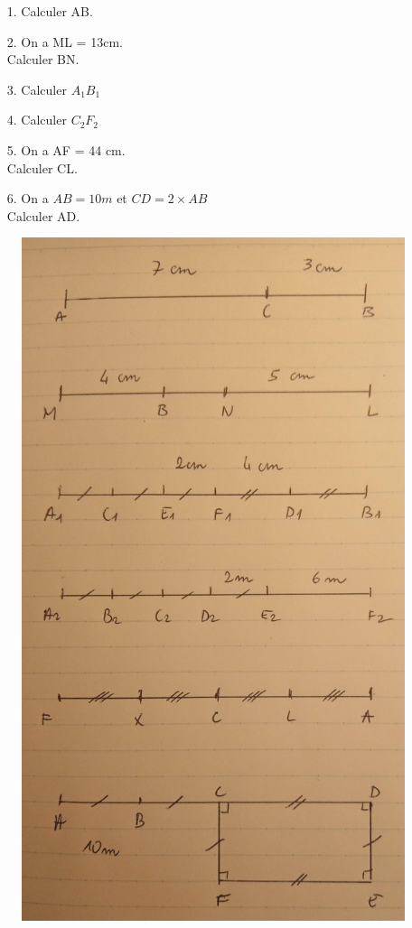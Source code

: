   \begin{minipage}[t]{0.30\textwidth}
    \begin{enumerate}
      \item[1.] Calculer AB. \\ \Pointilles[3]
      \item[2.] On a ML = 13cm. \\ Calculer BN. \\    \Pointilles[4]
      \item[3.] Calculer $A_1 B_1$ \\    \Pointilles[4]
      \item[4.] Calculer $C_2 F_2$ \\    \Pointilles[4]
      \item[5.] On a AF = 44 cm. \\ Calculer CL.   \Pointilles[4]
      \item[6.] On a $AB = 10m$ et $CD = 2 \times AB$ \\ Calculer AD.  \Pointilles[5]
    \end{enumerate}
    \end{minipage}
    \begin{minipage}[t]{0.70\textwidth}
      \begin{figure}[H]
        \centering
        \includegraphics[width=0.8\linewidth]{6x4-geometrie-base/ex3.png}
      \end{figure}
    \end{minipage}

